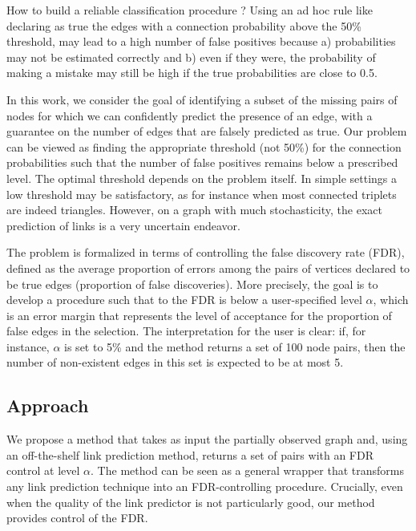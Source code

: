 \documentclass[a4paper, 11pt]{article}
\theoremstyle{remark}
\begin{document}
How to build a reliable classification procedure ? 
Using an ad hoc rule like declaring as true the edges with a connection probability above the 50\% threshold, may lead to a high number of false positives because a) probabilities may not be estimated correctly and b) even if they were, the probability of making a mistake may still be high if the true probabilities are close to 0.5. 


In this work, we consider the goal of identifying a subset of the missing pairs of nodes for which we can confidently predict the presence of an edge, with a guarantee on the number of edges that are falsely predicted as true. 
Our problem can be viewed as finding the appropriate threshold (not 50\%) for the connection probabilities such that the number of false positives remains below a prescribed level. The optimal threshold depends on the problem itself. In simple settings a low threshold may be satisfactory, as for instance when most connected triplets are indeed triangles. However, on a graph with much stochasticity, the exact prediction of links is a very uncertain endeavor.

The problem is formalized in terms of controlling the false discovery rate (FDR), defined as the average proportion of errors among the pairs of vertices declared to be true edges (proportion of false discoveries). More precisely, the goal is to develop a procedure such that to the FDR is below a user-specified level $\alpha$, which is an error margin that represents the level of acceptance for the proportion of false edges in the selection. 
The interpretation for the user is clear: if, for instance, $\alpha$ is set to 5\% and the method returns a set of 100 node pairs, then the number of non-existent edges in this set is expected to be at most 5. 



\subsection{Approach}


We propose a method that takes as input the partially observed graph and, using an off-the-shelf link prediction method, returns a set of pairs with an FDR control at level $\alpha$. The method can be seen as a general wrapper that transforms any link prediction technique into an FDR-controlling procedure. 
Crucially, even when the quality of the link predictor is not particularly good, our method provides control of the FDR.
\end{document}
